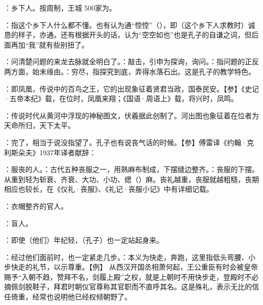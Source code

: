 {
\item {}：乡下人。按周制，王城 500家为。
\item {}：指这个乡下人什么都不懂。也有认为通“悾悾”（），即（这个乡下人求教时）诚恳的样子，亦通。还有根据开头的话，认为“空空如也”也是孔子的自谦之词，但后面再加“我”就有些别扭了。
\item {}：问清楚问题的来龙去脉就全明白了。：敲击，引申为探询，询问。：指问题的正反两方面，始末缘由。：穷尽，指探究到底，弄得水落石出。这是孔子的教学特色。
}
{}


{
\item {}：即凤凰，传说中的百鸟之王，它的出现象征着贤君当政，国泰民安。【参】《史记·五帝本纪》载，在位时，凤凰来翔；《国语·周语上》载，将兴时，凤鸣。
\item {}：传说时代从黄河中浮现的神秘图文，伏羲据此创制了。河出图也象征着在位者为天命所归，天下太平。
\item {}：完了，相当于说没指望了。孔子也有说丧气话的时候。【参】傅雷译《约翰·克利斯朵夫》1937年译者献辞： %
}
{}


{
\item {}：服丧的人。：古代五种丧服之一，用熟麻布制成，下摆缝边整齐。：丧服的下摆。从重到轻为斩衰、齐衰、大功、小功、缌（）麻。丧礼越重，丧服就越粗糙，丧期相应也较长，在《仪礼·丧服》、《礼记·丧服小记》中有详细记载。
\item {}：衣帽整齐的官人。
\item {}：盲人。
\item {}：即使（他们）年纪轻，（孔子）也一定站起身来。
\item {}：经过他们面前时，也一定紧走几步。：本义为快走，奔跑，这里指低头弯腰、小步快走的礼节，以示尊重。【例】 从西汉开国丞相萧何起，王公重臣有时会被皇帝赐予“入朝不趋，赞拜不名，剑履上殿”之权，就是上朝时不用快步走，登殿时不必摘佩剑脱鞋子，拜君时朝仪官尊称其官职而不直呼其名。这是殊礼，表示无比的信任倚重，经常也说明他已经权倾朝野了。
}
{}


